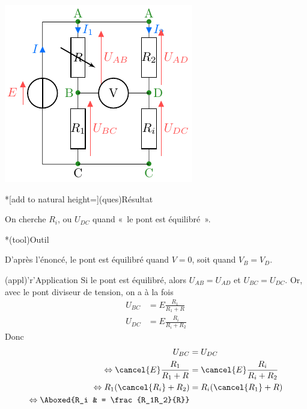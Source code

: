 \documentclass[../../main/main.tex]{subfiles}
\begin{document}
{\begin{tcbraster}[raster columns=6, raster equal height=rows]
\begin{tcb}[raster multicolumn=2]
        \begin{center}
            \includegraphics{wheatstone}
        \end{center}
    \end{tcb}
    \begin{tcolorbox}[blankest, raster multicolumn=1, space to=\myspace]
        \begin{tcbraster}[raster columns=1]
            \begin{tcb}*[add to natural height=\myspace](ques){Résultat}

                \fontsize{10pt}{12pt}\selectfont On cherche $R_i$, ou $U_{DC}$
                quand «~le pont est équilibré~».

            \end{tcb}
            \begin{tcb}*(tool){Outil}

                \fontsize{10pt}{12pt}\selectfont D'après l'énoncé, le pont est
                équilibré quand $V = 0$, soit quand $V_B = V_D$.

            \end{tcb}
        \end{tcbraster}
    \end{tcolorbox}
    \begin{tcb}[raster multicolumn=3](appl)'r'{Application}
        Si le pont est équilibré, alors $U_{AB} = U_{AD}$ et $U_{BC} = U_{DC}$.
        Or, avec le pont diviseur de tension, on a à la fois
        \begin{align*}
            U_{BC} & = E \frac{R_1}{R_1+R}\\
            U_{DC} & = E \frac{R_i}{R_i+R_2}
        \end{align*}
        Donc
        \begin{align*}
            U_{BC} &= U_{DC}\\
            \Leftrightarrow \cancel{E} \frac{R_1}{R_1+R}
                   & = \cancel{E} \frac{R_i}{R_i+R_2}\\
            \Leftrightarrow R_1(\cancel{R_i}+R_2) & = R_i(\cancel{R_1}+R)\\
            \Leftrightarrow \Aboxed{R_i & = \frac{R_1R_2}{R}}
        \end{align*}
    \end{tcb}
\end{tcbraster}
}
\end{document}
